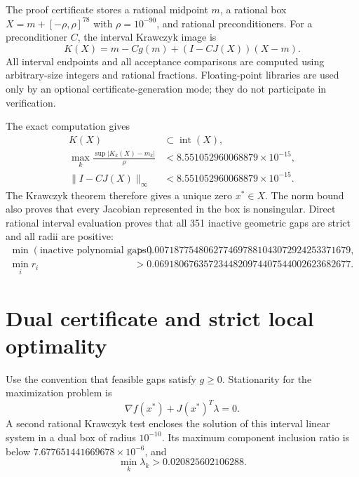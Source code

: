 \documentclass[11pt]{article}
\begin{document}
The proof certificate stores a rational midpoint $m$, a rational box
$X=m+[-\rho,\rho]^{78}$ with $\rho=10^{-90}$, and rational preconditioners.
For a preconditioner $C$, the interval Krawczyk image is
\begin{equation}
 K(X)=m-Cg(m)+(I-CJ(X))(X-m).                                \label{eq:krawczyk}
\end{equation}
All interval endpoints and all acceptance comparisons are computed using
arbitrary-size integers and rational fractions.  Floating-point libraries are
used only by an optional certificate-generation mode; they do not participate
in verification.

The exact computation gives
\begin{align}
 K(X)&\subset\operatorname{int}(X),                                      \label{eq:incl}\\
 \max_k\frac{\sup|K_k(X)-m_k|}{\rho}
     &<8.551052960068879\times10^{-15},                                  \label{eq:ratio}\\
 \lVert I-CJ(X)\rVert_\infty
     &<8.551052960068879\times10^{-15}.                                  \label{eq:norm}
\end{align}
The Krawczyk theorem \cite{krawczyk1969} therefore gives a unique zero
$x^*\in X$.  The norm bound also proves that every Jacobian represented in the
box is nonsingular.  Direct rational interval evaluation proves that all 351
inactive geometric gaps are strict and all radii are positive:
\begin{align}
 \min(\text{inactive polynomial gaps})&>
 0.0071877548062774697881043072924253371679,                 \label{eq:inactive}\\
 \min_i r_i&>
 0.0691806763572344820974407544002623682677.                 \label{eq:radii}
\end{align}

\section{Dual certificate and strict local optimality}                 \label{sec:proof}

Use the convention that feasible gaps satisfy $g\geq0$.  Stationarity for the
maximization problem is
\begin{equation}
  \nabla f(x^*)+J(x^*)^T\lambda=0.                           \label{eq:kkt}
\end{equation}
A second rational Krawczyk test encloses the solution of this interval linear
system in a dual box of radius $10^{-10}$.  Its maximum component inclusion
ratio is below $7.677651441669678\times10^{-6}$, and
\begin{equation}
  \min_k\lambda_k>0.020825602106288.                         \label{eq:lambda}
\end{equation}
\end{document}
